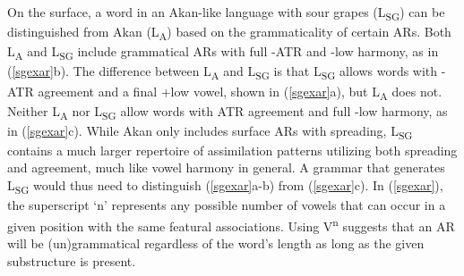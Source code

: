 \documentclass[,doc,floatsintext]{apa6}
\theoremstyle{definition}
\theoremstyle{definition}
\theoremstyle{definition}
\theoremstyle{remark}
\begin{document}
On the surface, a word in an Akan-like language with sour grapes
(L\textsubscript{SG}) can be distinguished from Akan
(L\textsubscript{A}) based on the grammaticality of certain ARs. Both
L\textsubscript{A} and L\textsubscript{SG} include grammatical ARs with
full -ATR and -low harmony, as in (\ref{sgexar}b). The difference
between L\textsubscript{A} and L\textsubscript{SG} is that
L\textsubscript{SG} allows words with -ATR agreement and a final +low
vowel, shown in (\ref{sgexar}a), but L\textsubscript{A} does not.
Neither L\textsubscript{A} nor L\textsubscript{SG} allow words with ATR
agreement and full -low harmony, as in (\ref{sgexar}c). While Akan only
includes surface ARs with spreading, L\textsubscript{SG} contains a much
larger repertoire of assimilation patterns utilizing both spreading and
agreement, much like vowel harmony in general. A grammar that generates
L\textsubscript{SG} would thus need to distinguish (\ref{sgexar}a-b)
from (\ref{sgexar}c). In (\ref{sgexar}), the superscript `n' represents
any possible number of vowels that can occur in a given position with
the same featural associations. Using V\textsuperscript{n} suggests that
an AR will be (un)grammatical regardless of the word's length as long as
the given substructure is present.
\end{document}
